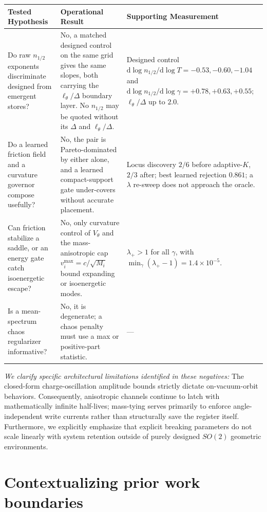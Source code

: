 \documentclass{article}
\begin{document}
\begin{center}
\begin{tabular}{@{}p{1.52in} p{1.52in} p{2.06in}@{}}
\toprule
Tested Hypothesis & Operational Result & Supporting Measurement \\
\midrule
Do raw $n_{1/2}$ exponents discriminate designed from emergent stores? &
No, a matched designed control on the same grid gives the same slopes, both carrying the $\ell_\theta/\Delta$ boundary layer. No $n_{1/2}$ may be quoted without its $\Delta$ and $\ell_\theta/\Delta$. &
Designed control $\mathrm{d}\log n_{1/2}/\mathrm{d}\log T=-0.53,-0.60,-1.04$ and $\mathrm{d}\log n_{1/2}/\mathrm{d}\log\gamma=+0.78,+0.63,+0.55$; $\ell_\theta/\Delta$ up to $2.0$. \\[2pt]
Do a learned friction field and a curvature governor compose usefully? &
No, the pair is Pareto-dominated by either alone, and a learned compact-support gate under-covers without accurate placement. &
Locus discovery $2/6$ before adaptive-$K$, $2/3$ after; best learned rejection $0.861$; a $\lambda$ re-sweep does not approach the oracle. \\[2pt]
Can friction stabilize a saddle, or an energy gate catch isoenergetic escape? &
No, only curvature control of $V_\theta$ and the mass-anisotropic cap $v_i^{\max}=c/\sqrt{M_i}$ bound expanding or isoenergetic modes. &
$\lambda_+>1$ for all $\gamma$, with $\min_\gamma(\lambda_+-1)=1.4{\times}10^{-5}$. \\[2pt]
Is a mean-spectrum chaos regularizer informative? &
No, it is degenerate; a chaos penalty must use a max or positive-part statistic. &
--- \\[2pt]
\bottomrule
\end{tabular}
\end{center}

\emph{We clarify specific architectural limitations identified in these negatives:} The closed-form charge-oscillation amplitude bounds strictly dictate on-vacuum-orbit behaviors. Consequently, anisotropic channels continue to latch with mathematically infinite half-lives; mass-tying serves primarily to enforce angle-independent write currents rather than structurally save the register itself. Furthermore, we explicitly emphasize that explicit breaking parameters do not scale linearly with system retention outside of purely designed $SO(2)$ geometric environments.

\section{Contextualizing prior work boundaries}\label{app:pos}
\end{document}
